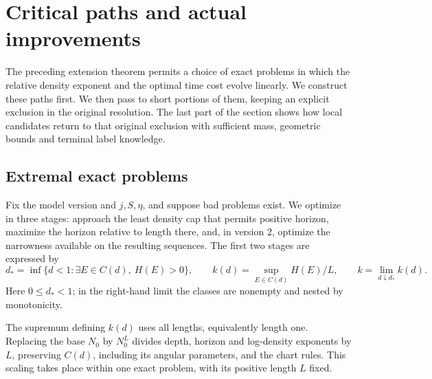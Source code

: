 \section{Critical paths and actual improvements}\label{sec:critical-paths}

The preceding extension theorem permits a choice of exact problems in which
the relative density exponent and the optimal time cost evolve linearly.  We construct
these paths first.  We then pass to short portions of them, keeping an
explicit exclusion in the original resolution.  The last part of the section
shows how local candidates return to that original exclusion with sufficient
mass, geometric bounds and terminal label knowledge.

\subsection{Extremal exact problems}

Fix the model version and \(j,S,\eta\), and suppose bad problems exist.
We optimize in three stages: approach the least density cap that permits
positive horizon, maximize the horizon relative to length there, and,
in version 2, optimize the narrowness available on the resulting
sequences. The first two stages are expressed by
\begin{equation}
d_*=\inf\{d<1:\exists E\in C(d),\ H(E)>0\},\qquad
 k(d)=\sup_{E\in C(d)}H(E)/L,\qquad
 k=\lim_{d\downarrow d_*} k(d).\label{a03:extremal-rates}
\end{equation}
Here \(0\le d_*<1\); in the right-hand limit the classes are nonempty
and nested by monotonicity.

The supremum defining \(k(d)\) uses all lengths, equivalently length
one. Replacing the base \(N_0\) by \(N_0^L\) divides depth, horizon
and log-density exponents by \(L\), preserving \(C(d)\), including
its angular parameters, and the chart rules. This scaling takes place
within one exact problem, with its positive length \(L\) fixed.


